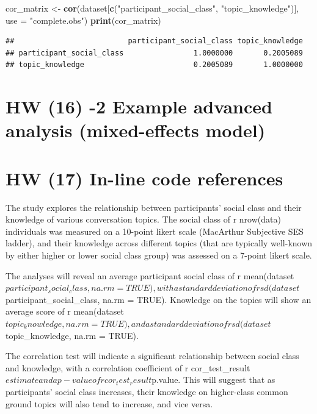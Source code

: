 \documentclass[
  man]{apa6}
\newenvironment{Shaded}{\begin{snugshade}}{\end{snugshade}}
\newcommand{\AttributeTok}[1]{\textcolor[rgb]{0.13,0.29,0.53}{#1}}
\newcommand{\FunctionTok}[1]{\textcolor[rgb]{0.13,0.29,0.53}{\textbf{#1}}}
\newcommand{\NormalTok}[1]{#1}
\newcommand{\OtherTok}[1]{\textcolor[rgb]{0.56,0.35,0.01}{#1}}
\newcommand{\StringTok}[1]{\textcolor[rgb]{0.31,0.60,0.02}{#1}}
\begin{document}
\begin{Shaded}
\begin{Highlighting}[]
\NormalTok{cor\_matrix }\OtherTok{\textless{}{-}} \FunctionTok{cor}\NormalTok{(dataset[}\FunctionTok{c}\NormalTok{(}\StringTok{"participant\_social\_class"}\NormalTok{, }\StringTok{"topic\_knowledge"}\NormalTok{)], }\AttributeTok{use =} \StringTok{"complete.obs"}\NormalTok{)}
\FunctionTok{print}\NormalTok{(cor\_matrix)}
\end{Highlighting}
\end{Shaded}

\begin{verbatim}
##                          participant_social_class topic_knowledge
## participant_social_class                1.0000000       0.2005089
## topic_knowledge                         0.2005089       1.0000000
\end{verbatim}

\hypertarget{hw-16--2-example-advanced-analysis-mixed-effects-model}{%
\section{HW (16) -2 Example advanced analysis (mixed-effects model)}\label{hw-16--2-example-advanced-analysis-mixed-effects-model}}

\hypertarget{hw-17-in-line-code-references}{%
\section{HW (17) In-line code references}\label{hw-17-in-line-code-references}}

The study explores the relationship between participants' social class and their knowledge of various conversation topics. The social class of r nrow(data) individuals was measured on a 10-point likert scale (MacArthur Subjective SES ladder), and their knowledge across different topics (that are typically well-known by either higher or lower social class group) was assessed on a 7-point likert scale.

The analyses will reveal an average participant social class of r mean(dataset\(participant_social_class, na.rm = TRUE), with a standard deviation of r sd(dataset\)participant\_social\_class, na.rm = TRUE). Knowledge on the topics will show an average score of r mean(dataset\(topic_knowledge, na.rm = TRUE), and a standard deviation of r sd(dataset\)topic\_knowledge, na.rm = TRUE).

The correlation test will indicate a significant relationship between social class and knowledge, with a correlation coefficient of r cor\_test\_result\(estimate and a p-value of r cor_test_result\)p.value. This will suggest that as participants' social class increases, their knowledge on higher-class common ground topics will also tend to increase, and vice versa.
\end{document}
